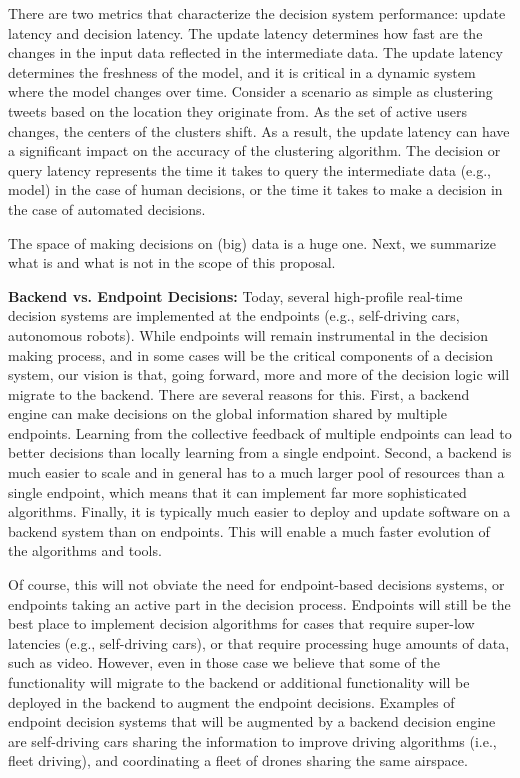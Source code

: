 There are two metrics that characterize the decision system performance: update latency and decision latency. The update latency determines how fast are the changes in the input data reflected in the intermediate data. The update latency determines the freshness of the model, and it is critical in a dynamic system where the model changes over time. Consider a scenario as simple as clustering tweets based on the location they originate from. As the set of active users changes, the centers of the clusters shift. As a result, the update latency can have a significant impact on the accuracy of the clustering algorithm. The decision or query latency represents the time it takes to query the intermediate data (e.g., model) in the case of human decisions, or the time it takes to make a decision in the case of automated decisions.


The space of making decisions on (big) data is a huge one. Next, we summarize what is and what is not in the scope of this proposal.

{\bf Backend vs. Endpoint Decisions:} Today, several high-profile real-time decision systems are implemented at the endpoints (e.g., self-driving cars, autonomous robots). While endpoints will remain instrumental in the decision making process, and in some cases will be the critical components of a decision system, our vision is that, going forward, more and more of the decision logic will migrate to the backend. There are several reasons for this. First, a backend engine can make decisions on the global information shared by multiple endpoints. Learning from the collective feedback of multiple endpoints can lead to better decisions than locally learning from a single endpoint. Second, a backend is much easier to scale and in general has to a much larger pool of resources than a single endpoint, which means that it can implement far more sophisticated algorithms. Finally, it is typically much easier to deploy and update software on a backend system than on endpoints. This will enable a much faster evolution of the algorithms and tools.

Of course, this will not obviate the need for endpoint-based decisions systems, or endpoints taking an active part in the decision process. Endpoints will still be the best place to implement decision algorithms for cases that require super-low latencies (e.g., self-driving cars), or that require processing huge amounts of data, such as video. However, even in those case we believe that some of the functionality will migrate to the backend or additional functionality will be deployed in the backend to augment the endpoint decisions. Examples of endpoint decision systems that will be augmented by a backend decision engine are self-driving cars sharing the information to improve driving algorithms (i.e., fleet driving), and coordinating a fleet of drones sharing the same airspace.  

